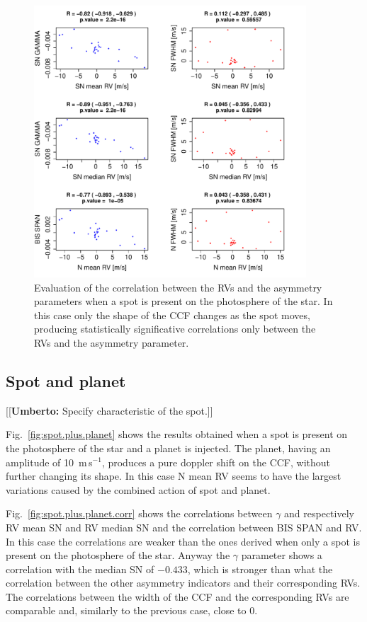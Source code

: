 \documentclass[11pt, oneside]{article}
\def\ms{\hbox{\,m\,s$^{-1}$}}         %
\newcommand{\umberto}[1]{{\color{green}[[\textbf{Umberto: }#1]]}}
\begin{document}
{\begin{figure}[htbp]
   \centering
\includegraphics[height = 4in]{SOAP_SPOT_Comparison_para_SN.pdf} 
   \caption{Evaluation of the correlation between the RVs and the asymmetry parameters when a spot is present on the photosphere of the star. In this case only the shape of the CCF changes as the spot moves, producing statistically significative correlations only between the RVs and the asymmetry parameter.}
    \label{fig:spot.corr}
\end{figure}

\subsection{Spot and planet} \label{sec:soap.spot.planet}

\umberto{Specify characteristic of the spot.}

Fig.~\ref{fig:spot.plus.planet} shows the results obtained when a spot is present on the photosphere of the star and a planet is injected. The planet, having an amplitude of 10 \ms, produces a pure doppler shift on the CCF, without further changing its shape.  In this case N mean RV seems to have the largest variations caused by the combined action of spot and planet. %

Fig.~\ref{fig:spot.plus.planet.corr} shows the correlations between $\gamma$ and respectively RV mean SN and RV median SN and the correlation between BIS SPAN and RV. In this case the correlations are weaker than the ones derived when only a spot is present on the photosphere of the star. Anyway the $\gamma$ parameter shows a correlation with the median SN of $-0.433$, which is stronger than what the correlation between the other asymmetry indicators and their corresponding RVs. The correlations between the width of the CCF and the corresponding RVs are comparable and, similarly to the previous case, close to $0$.

}
\end{document}

